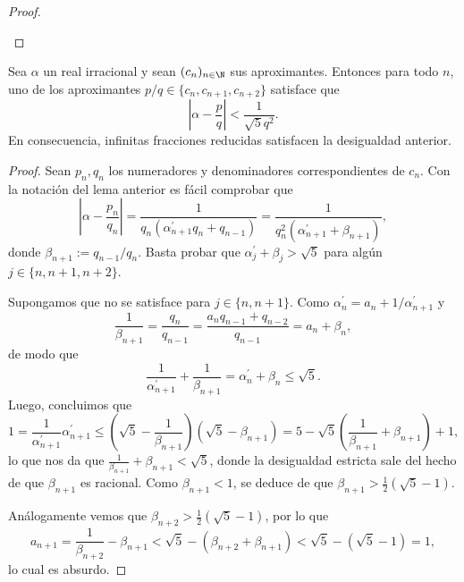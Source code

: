 \documentclass[teoria-numeros.tex]{subfiles}
\begin{document}
\begin{proof}
\begin{enumerate}
	\end{enumerate}
\end{proof}

\begin{thm}[Hurwitz]
	Sea $\alpha$ un real irracional y sean $(c_n)_{n\in\N}$ sus aproximantes.
	Entonces para todo $n$, uno de los aproximantes $p/q \in \{ c_n, c_{n+1}, c_{n+2} \}$ satisface que
	$$ \left| \alpha - \frac{p}{q} \right| < \frac{1}{\sqrt{5}q^2}. $$
	En consecuencia, infinitas fracciones reducidas satisfacen la desigualdad anterior.
\end{thm}
\begin{proof}
	Sean $p_n, q_n$ los numeradores y denominadores correspondientes de $c_n$.
	Con la notación del lema anterior es fácil comprobar que
	$$ \left| \alpha - \frac{p_n}{q_n} \right| = \frac{1}{q_n( \alpha^\prime_{n+1}q_n + q_{n-1} )} = \frac{1}{q_n^2(\alpha^\prime_{n+1} + \beta_{n+1})}, $$
	donde $\beta_{n+1} := q_{n-1}/q_n$.
	Basta probar que $\alpha_j^\prime + \beta_j > \sqrt{5}$ para algún $j \in \{ n, n+1, n+2 \}$.

	Supongamos que no se satisface para $j \in \{ n, n+1 \}$.
	Como $\alpha^\prime_n = a_n + 1/\alpha^\prime_{n+1}$ y
	$$ \frac{1}{\beta_{n+1}} = \frac{q_n}{q_{n-1}} = \frac{a_{n}q_{n-1} + q_{n-2}}{q_{n-1}} = a_n + \beta_n, $$
	de modo que
	$$ \frac{1}{\alpha^\prime_{n+1}} + \frac{1}{\beta_{n+1}} = \alpha^\prime_n + \beta_n \le \sqrt{5}. $$
	Luego, concluimos que
	$$ 1 = \frac{1}{\alpha_{n+1}^\prime} \alpha_{n+1}^\prime \le \left( \sqrt{5} - \frac{1}{\beta_{n+1}} \right)( \sqrt{5} - \beta_{n+1} ) =
	5 - \sqrt{5}\left( \frac{1}{\beta_{n+1}} + \beta_{n+1} \right) + 1, $$
	lo que nos da que $\frac{1}{\beta_{n+1}} + \beta_{n+1} < \sqrt{5}$, donde la desigualdad estricta sale del hecho de que $\beta_{n+1}$ es racional.
	Como $\beta_{n+1} < 1$, se deduce de que $\beta_{n+1} > \frac{1}{2}( \sqrt{5} - 1 )$.

	Análogamente vemos que $\beta_{n+2} > \frac{1}{2}( \sqrt{5} - 1 )$, por lo que
	$$ a_{n+1} = \frac{1}{\beta_{n+2}} - \beta_{n+1} < \sqrt{5} - (\beta_{n+2} + \beta_{n+1}) < \sqrt{5} - (\sqrt{5} - 1) = 1, $$
	lo cual es absurdo.
\end{proof}
\end{document}

